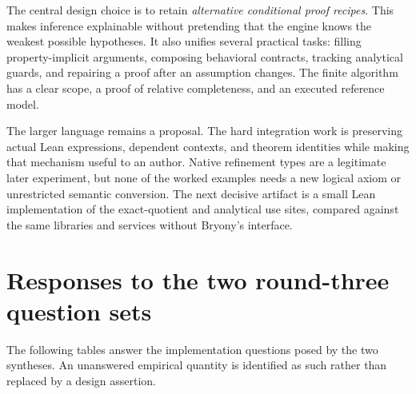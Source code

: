 \documentclass[11pt,a4paper]{article}
\theoremstyle{definition}\newtheorem{definition}[theorem]{Definition}
\theoremstyle{remark}\newtheorem{remark}[theorem]{Remark}
\begin{document}
The central design choice is to retain \emph{alternative conditional proof recipes}. This makes inference explainable without pretending that the engine knows the weakest possible hypotheses. It also unifies several practical tasks: filling property-implicit arguments, composing behavioral contracts, tracking analytical guards, and repairing a proof after an assumption changes. The finite algorithm has a clear scope, a proof of relative completeness, and an executed reference model.

The larger language remains a proposal. The hard integration work is preserving actual Lean expressions, dependent contexts, and theorem identities while making that mechanism useful to an author. Native refinement types are a legitimate later experiment, but none of the worked examples needs a new logical axiom or unrestricted semantic conversion. The next decisive artifact is a small Lean implementation of the exact-quotient and analytical use sites, compared against the same libraries and services without Bryony's interface.

\clearpage\appendix
\section{Responses to the two round-three question sets}\label{app:questions}
The following tables answer the implementation questions posed by the two syntheses. An unanswered empirical quantity is identified as such rather than replaced by a design assertion.
\end{document}
